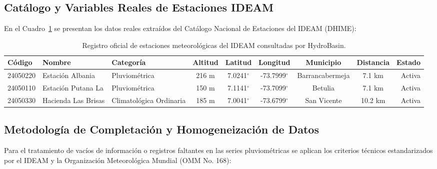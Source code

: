 \documentclass[11pt,a4paper]{article}
\begin{document}
\subsection*{Catálogo y Variables Reales de Estaciones IDEAM}
En el Cuadro~\ref{tab:anexo_ideam} se presentan los datos reales extraídos del Catálogo Nacional de Estaciones del IDEAM (DHIME):

\begin{table}[H]
\centering
\caption{Registro oficial de estaciones meteorológicas del IDEAM consultadas por HydroBasin.}
\label{tab:anexo_ideam}
%
\begin{tabular}{lllcccccr}\toprule
\textbf{Código} & \textbf{Nombre} & \textbf{Categoría} & \textbf{Altitud} & \textbf{Latitud} & \textbf{Longitud} & \textbf{Municipio} & \textbf{Distancia} & \textbf{Estado} \\\midrule
24050220 & Estación Albania & Pluviométrica & 216 m & 7.0241$^\circ$ & -73.7999$^\circ$ & Barrancabermeja & 7.1 km & Activa \\
24050110 & Estación Putana La & Pluviométrica & 150 m & 7.1141$^\circ$ & -73.7099$^\circ$ & Betulia & 7.1 km & Activa \\
24050330 & Hacienda Las Brisas & Climatológica Ordinaria & 185 m & 7.0041$^\circ$ & -73.6799$^\circ$ & San Vicente & 10.2 km & Activa \\
\bottomrule
\end{tabular}
\end{table}

\subsection*{Metodología de Completación y Homogeneización de Datos}
Para el tratamiento de vacíos de información o registros faltantes en las series pluviométricas se aplican los criterios técnicos estandarizados por el IDEAM y la Organización Meteorológica Mundial (OMM No. 168):
\end{document}
